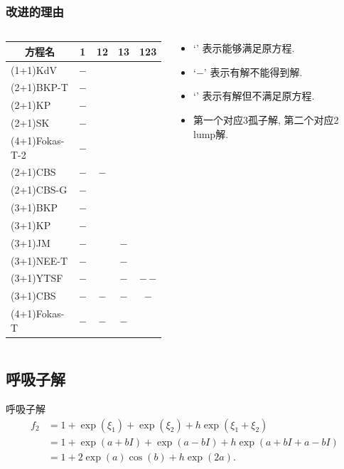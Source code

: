\documentclass[handout]{beamer}
\newcommand{\sbrace}[1]{\left(#1\right)}
\newcommand{\tpa}{\checkmark}
\newcommand{\tpb}{$-$}
\newcommand{\tpc}{\texttimes}
\begin{document}
\begin{frame}
\frametitle{改进的理由}
\begin{columns}
\begin{column}{0.65\textwidth}
\begin{table}
\centering
\small 
\begin{tabular}{lcccc}
\hline
\multicolumn{1}{c}{方程名} & 1 & 12 & 13 & 123 \\ 
\hline
(1+1)KdV & \tpa\tpb & & & \\
(2+1)BKP-T & \tpa\tpb & \tpa\tpa & & \\
(2+1)KP &\tpa\tpb &\tpa\tpa & & \\
(2+1)SK &\tpa\tpb &\tpa\tpa & & \\
(4+1)Fokas-T-2 &\tpa\tpb &\tpa\tpa & & \\
(2+1)CBS & \tpa\tpb & \tpa\tpb & & \\
(2+1)CBS-G & \tpa\tpb & \tpc\tpc & & \\
(3+1)BKP &\tpa\tpb &\tpa\tpa &\tpa\tpa &\tpc\tpc \\
(3+1)KP &\tpa\tpb &\tpa\tpa &\tpa\tpa &\tpc\tpc \\
(3+1)JM &\tpa\tpb &\tpa\tpa &\tpa\tpb &\tpc\tpc \\
(3+1)NEE-T &\tpa\tpb &\tpa\tpa &\tpa\tpb &\tpc\tpc \\
(3+1)YTSF &\tpa\tpb &\tpa\tpa &\tpa\tpb &\tpb\,\tpb \\
(3+1)CBS &\tpa\tpb &\tpa\tpb &\tpa\tpb &\tpa\tpb \\
(4+1)Fokas-T &\tpa\tpb &\tpa\tpb &\tpa\tpb &\tpc\tpc \\
\hline
\end{tabular}
\end{table}
\end{column}
\begin{column}{0.35\textwidth}
\begin{itemize}
\item `\tpa{}' 表示能够满足原方程.
\item `\tpb{}' 表示有解不能得到解.
\item `\tpc{}' 表示有解但不满足原方程.
\item 第一个对应3孤子解, 第二个对应2 lump解.
\end{itemize}
\end{column}
\end{columns}
\end{frame}

\subsection{呼吸子解}
\begin{frame}{呼吸子解}
\begin{equation}
\begin{aligned}
f_2&=1+\exp\sbrace{\xi_1}+\exp\sbrace{\xi_2}+h\exp\sbrace{\xi_1+\xi_2} \\ 
&=1+\exp(a+bI)+\exp(a-bI)+h\exp(a+bI+a-bI) \\ 
&=1+2\exp(a)\cos(b)+h\exp(2a).
\end{aligned}
\end{equation}
\end{frame}
\end{document}
